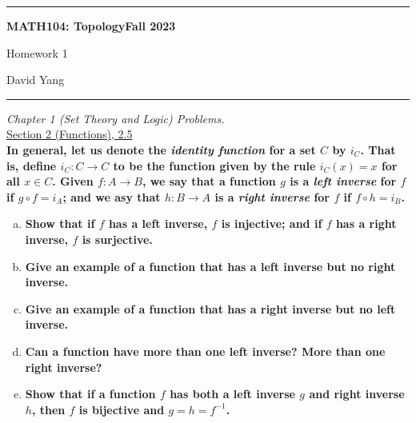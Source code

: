 \documentclass[11pt]{article}
\begin{document}
	\hrule
	\begin{center}
        \textbf{MATH104: Topology}\hfill \textbf{Fall 2023}\newline

		{\Large Homework 1}

		David Yang
	\end{center}

\hrule

\vspace{1em}

\textit{Chapter 1 (Set Theory and Logic) Problems.} \\

\underline{Section 2 (Functions), 2.5} \\

\textbf{In general, let us denote the \textit{identity function} for a set $C$ by $i_C$. That is,
define $i_C \colon C \rightarrow C$ to be the function given by the rule $i_C(x) = x$ for all $x \in C$. Given $f \colon A \rightarrow B$, we say that a function
$g$ is a \textit{left inverse} for $f$ if $g \circ f = i_A$; and we asy that $h \colon B \rightarrow A$ is a \textit{right inverse} for $f$ if
$f \circ h = i_B$.}

\begin{enumerate}[a)]
    \item \textbf{Show that if $f$ has a left inverse, $f$ is injective; and if $f$ has a right inverse, $f$ is surjective.}
    \item \textbf{Give an example of a function that has a left inverse but no right inverse.}
    \item \textbf{Give an example of a function that has a right inverse but no left inverse.}
    \item \textbf{Can a function have more than one left inverse? More than one right inverse?}
    \item \textbf{Show that if a function $f$ has both a left inverse $g$ and right inverse $h$, then $f$ is bijective and $g = h = f^{-1}$.}
\end{enumerate}
\end{document}
